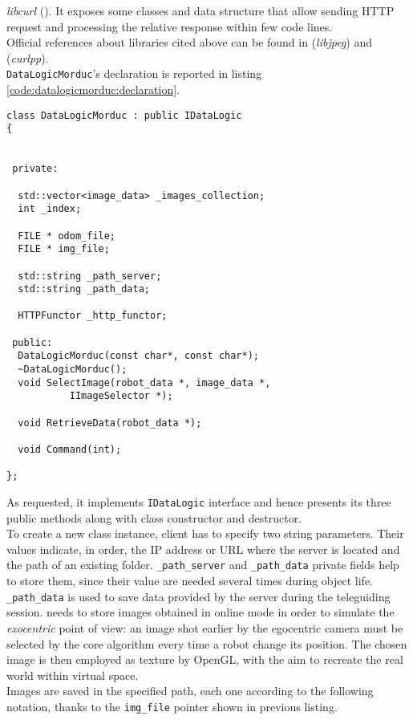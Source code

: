 \textit{libcurl} (\cite{library:libcurl}). It exposes some
classes and data structure
that allow sending HTTP request and processing the relative
response within few code lines.
\\
Official references about libraries cited above can be
found in \cite{library:libjpeg} (\textit{libjpeg}) and
\cite{library:curlpp} (\textit{curlpp}).
\\
\texttt{DataLogicMorduc}'s declaration is reported in
listing \ref{code:datalogicmorduc:declaration}.
\\
\begin{lstlisting}[caption={\texttt{DataLogicLogMorduc} declaration},
    label={code:datalogicmorduc:declaration}]
class DataLogicMorduc : public IDataLogic
{
  

 private:

  std::vector<image_data> _images_collection;
  int _index;
  
  FILE * odom_file;
  FILE * img_file;

  std::string _path_server;
  std::string _path_data;

  HTTPFunctor _http_functor;
  
 public:
  DataLogicMorduc(const char*, const char*);
  ~DataLogicMorduc();
  void SelectImage(robot_data *, image_data *,
		   IImageSelector *);

  void RetrieveData(robot_data *);

  void Command(int);

};
\end{lstlisting}

As requested, it implements \texttt{IDataLogic} interface and
hence presents its three public methods along with class constructor
and destructor.
\\
To create a new class instance, client has to specify
two string parameters. Their values indicate, in order, the IP
address or URL where the server is located and the path of an
existing folder. \texttt{\_path\_server} and \texttt{\_path\_data}
private fields help to store them, since their value are needed
several times during object life.
\\
\texttt{\_path\_data} is used to save data provided by the server during the
teleguiding session. \framework{} needs to store images obtained
in online mode in order to simulate the \textit{exocentric} point
of view: an image shot earlier by the egocentric camera must be
selected by the core algorithm every time a robot change its position.
The chosen image is then employed as texture by OpenGL, with the aim
to recreate the real world within virtual space.
\\
Images are saved in the specified path, each one according to the
following notation, thanks to the \texttt{img\_file} pointer
shown in previous listing.


